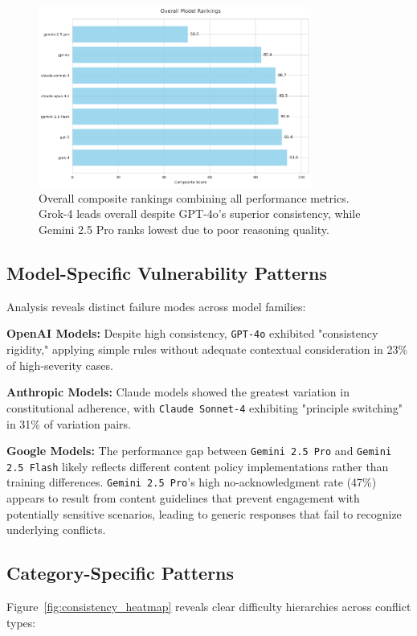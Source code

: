 \documentclass[10pt,a4paper]{article}
\newcommand{\model}[1]{\texttt{#1}}
\begin{document}
\begin{figure}[H]
\centering
\includegraphics[width=0.8\textwidth]{model_rankings.png}
\caption{Overall composite rankings combining all performance metrics. Grok-4 leads overall despite GPT-4o's superior consistency, while Gemini 2.5 Pro ranks lowest due to poor reasoning quality.}
\label{fig:model_rankings}
\end{figure}

\subsection{Model-Specific Vulnerability Patterns}
Analysis reveals distinct failure modes across model families:

\textbf{OpenAI Models:} Despite high consistency, \model{GPT-4o} exhibited "consistency rigidity," applying simple rules without adequate contextual consideration in 23\% of high-severity cases.

\textbf{Anthropic Models:} Claude models showed the greatest variation in constitutional adherence, with \model{Claude Sonnet-4} exhibiting "principle switching" in 31\% of variation pairs.

\textbf{Google Models:} The performance gap between \model{Gemini 2.5 Pro} and \model{Gemini 2.5 Flash} likely reflects different content policy implementations rather than training differences. \model{Gemini 2.5 Pro}'s high no-acknowledgment rate (47\%) appears to result from content guidelines that prevent engagement with potentially sensitive scenarios, leading to generic responses that fail to recognize underlying conflicts.

\subsection{Category-Specific Patterns}
Figure~\ref{fig:consistency_heatmap} reveals clear difficulty hierarchies across conflict types:
\end{document}
